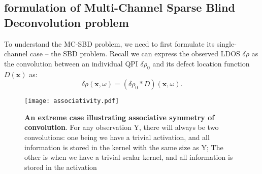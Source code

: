 \subsection{formulation of Multi-Channel Sparse Blind Deconvolution problem}
To understand the \ac{MC-SBD} problem, we need to first formulate its single-channel case --  the \ac{SBD} problem. Recall we can express the observed \ac{LDOS} $\delta\rho$ as the convolution between an individual QPI $\delta\rho_0$ and its defect location function $D(\mathbf{x})$ as: 
\begin{equation}
	\delta \rho(\mathbf{x}, \omega) = (\delta \rho_0 *D)(\mathbf{x}, \omega).
\end{equation}

\begin{figure}
	\texttt{[image: associativity.pdf]} 
	\centering
	\caption[\textbf{An extreme case illustrating associative symmetry of convolution}]{\textbf{An extreme case illustrating associative symmetry of convolution}. For any observation Y, there will always be two convolutions: one being we have a trivial activation, and all information is stored in the kernel with the same size as Y; The other is when we have a trivial scalar kernel, and all information is stored in the activation}
	\label{fig:ch6_assoc}
\end{figure}

